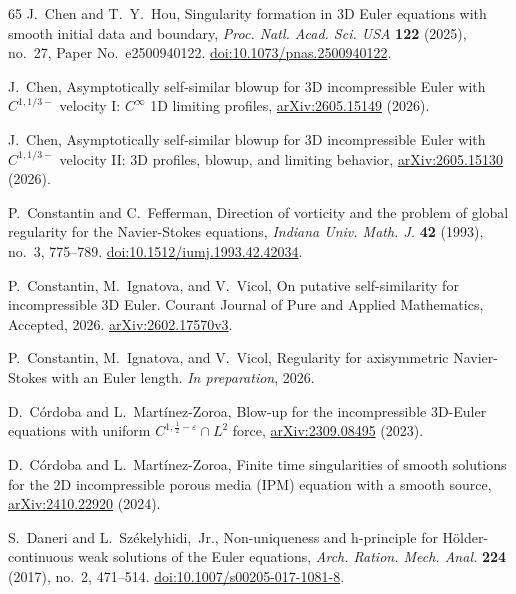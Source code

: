 \documentclass[11pt,reqno]{amsproc}
\numberwithin{equation}{section}
\theoremstyle{remark}
\newcommand{\eps}{\varepsilon}
\begin{document}
\begin{thebibliography}{65}
J.~Chen and T.~Y.~Hou,
Singularity formation in 3D Euler equations with smooth initial data and boundary,
\emph{Proc. Natl. Acad. Sci. USA} \textbf{122} (2025), no.~27, Paper No.~e2500940122.
\href{https://doi.org/10.1073/pnas.2500940122}{doi:10.1073/pnas.2500940122}.

J.~Chen,
Asymptotically self-similar blowup for 3D incompressible Euler with $C^{1,1/3-}$ velocity I: $C^\infty$ 1D limiting profiles,
\href{https://arxiv.org/abs/2605.15149}{arXiv:2605.15149} (2026).

J.~Chen,
Asymptotically self-similar blowup for 3D incompressible Euler with $C^{1,1/3-}$ velocity II: 3D profiles, blowup, and limiting behavior,
\href{https://arxiv.org/abs/2605.15130}{arXiv:2605.15130} (2026).

P.~Constantin and C.~Fefferman,
Direction of vorticity and the problem of global regularity for the Navier-Stokes equations,
\emph{Indiana Univ. Math. J.} \textbf{42} (1993), no.~3, 775--789.
\href{https://doi.org/10.1512/iumj.1993.42.42034}{doi:10.1512/iumj.1993.42.42034}.

P.~Constantin, M.~Ignatova, and V.~Vicol,
On putative self-similarity for incompressible 3D Euler. Courant Journal of Pure and Applied Mathematics, Accepted, 2026.
\href{https://arxiv.org/abs/2602.17570v3}{arXiv:2602.17570v3}.

P.~Constantin, M.~Ignatova, and V.~Vicol,
Regularity for axisymmetric Navier-Stokes with an Euler length.
\emph{In preparation}, 2026.

D.~C\'ordoba and L.~Mart\'inez-Zoroa,
Blow-up for the incompressible 3D-Euler equations with uniform $C^{1,\frac12-\eps}\cap L^2$ force,
\href{https://arxiv.org/abs/2309.08495}{arXiv:2309.08495} (2023).

D.~C\'ordoba and L.~Mart\'inez-Zoroa,
Finite time singularities of smooth solutions for the 2D incompressible porous media (IPM) equation with a smooth source,
\href{https://arxiv.org/abs/2410.22920}{arXiv:2410.22920} (2024).

S.~Daneri and L.~Sz\'ekelyhidi,~Jr.,
Non-uniqueness and h-principle for H\"older-continuous weak solutions of the Euler equations,
\emph{Arch. Ration. Mech. Anal.} \textbf{224} (2017), no.~2, 471--514.
\href{https://doi.org/10.1007/s00205-017-1081-8}{doi:10.1007/s00205-017-1081-8}.


\end{thebibliography}
\end{document}
